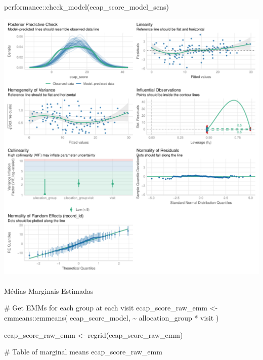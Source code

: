 \documentclass[
  letterpaper,
  DIV=11,
  numbers=noendperiod]{scrartcl}
\makeatletter
\let\oldparagraph\paragraph
\renewcommand{\paragraph}{
    \@ifstar
      \xxxParagraphStar
      \xxxParagraphNoStar
  }
\newcommand{\xxxParagraphStar}[1]{\oldparagraph*{#1}\mbox{}}
\newcommand{\xxxParagraphNoStar}[1]{\oldparagraph{#1}\mbox{}}
\newenvironment{Shaded}{\begin{snugshade}}{\end{snugshade}}
\newcommand{\CommentTok}[1]{\textcolor[rgb]{0.37,0.37,0.37}{#1}}
\newcommand{\FunctionTok}[1]{\textcolor[rgb]{0.28,0.35,0.67}{#1}}
\newcommand{\NormalTok}[1]{\textcolor[rgb]{0.00,0.23,0.31}{#1}}
\newcommand{\OtherTok}[1]{\textcolor[rgb]{0.00,0.23,0.31}{#1}}
\newcommand{\SpecialCharTok}[1]{\textcolor[rgb]{0.37,0.37,0.37}{#1}}
\makeatother
\begin{document}
\begin{Shaded}
\begin{Highlighting}[]
\NormalTok{performance}\SpecialCharTok{::}\FunctionTok{check\_model}\NormalTok{(ecap\_score\_model\_sens)}
\end{Highlighting}
\end{Shaded}

\includegraphics{Outcomes_V1V2V3_files/figure-pdf/ecap_score_4-2.pdf}

\paragraph{Médias Marginais
Estimadas}\label{muxe9dias-marginais-estimadas-25}

\begin{Shaded}
\begin{Highlighting}[]
\CommentTok{\# Get EMMs for each group at each visit}
\NormalTok{ecap\_score\_raw\_emm }\OtherTok{\textless{}{-}}\NormalTok{ emmeans}\SpecialCharTok{::}\FunctionTok{emmeans}\NormalTok{(}
\NormalTok{    ecap\_score\_model, }
    \SpecialCharTok{\textasciitilde{}}\NormalTok{ allocation\_group }\SpecialCharTok{*}\NormalTok{ visit}
\NormalTok{)}

\NormalTok{ecap\_score\_raw\_emm }\OtherTok{\textless{}{-}} \FunctionTok{regrid}\NormalTok{(ecap\_score\_raw\_emm)}

\CommentTok{\# Table of marginal means}
\NormalTok{ecap\_score\_raw\_emm}
\end{Highlighting}
\end{Shaded}
\end{document}
